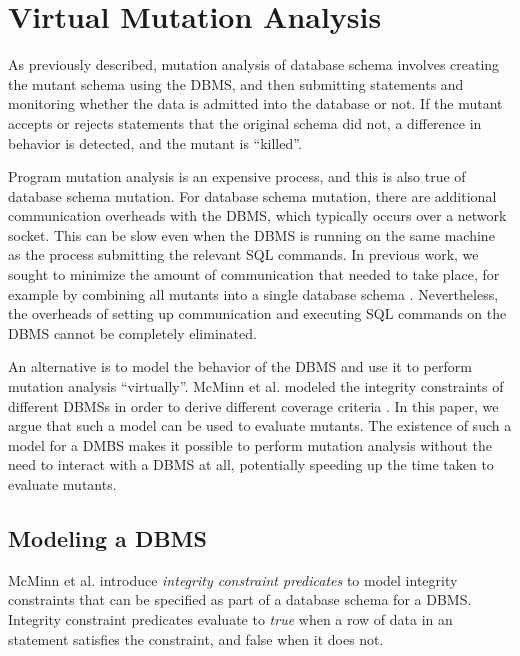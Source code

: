 
\section{Virtual Mutation Analysis}
\label{sec:virtual-mutation-analysis}

As previously described, mutation analysis of database schema involves creating the mutant schema using the DBMS, and then submitting \INSERT statements and monitoring whether the data is admitted into the database or not. If the mutant accepts or rejects \INSERT statements that the original schema did not, a difference in behavior is detected, and the mutant is ``killed''.

Program mutation analysis is an expensive process, and this is also true of database schema mutation. For database schema mutation, there are additional communication overheads with the DBMS, which typically occurs over a network socket. This can be slow even when the DBMS is running on the same machine as the process submitting the relevant SQL commands. 
In previous work, we sought to minimize the amount of communication that needed to take place, for example by combining all mutants into a single database schema \cite{Wright2013}. 
Nevertheless, the overheads of setting up communication and executing SQL commands on the DBMS cannot be completely eliminated.

An alternative is to model the behavior of the DBMS and use it to perform mutation analysis ``virtually''. McMinn et al. modeled the integrity constraints of different DBMSs in order to derive different coverage criteria \cite{McMinn2015}. In this paper, we argue that such a model can be used to evaluate mutants. The existence of such a model for a DMBS makes it possible to perform mutation analysis without the need to interact with a DBMS at all, potentially speeding up the time taken to evaluate mutants.

\subsection{Modeling a DBMS}
McMinn et al. introduce {\it integrity constraint predicates} to model integrity constraints that can be specified as part of a database schema for a DBMS. Integrity constraint predicates evaluate to {\it true} when a row of data in an \INSERT statement satisfies the constraint, and false when it does not.






